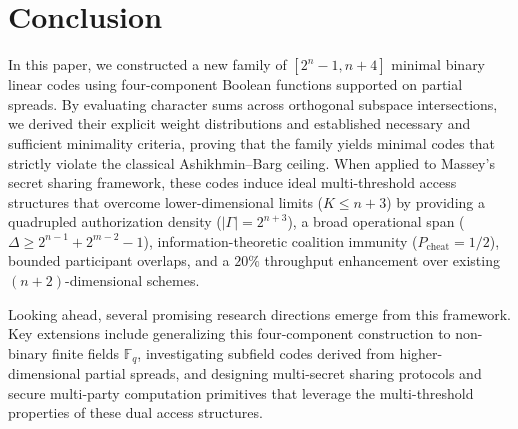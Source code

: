 \documentclass[pdflatex,sn-mathphys-num]{sn-jnl}%
\theoremstyle{thmstyleone}%
\theoremstyle{thmstyletwo}%
\theoremstyle{thmstylethree}%
\begin{document}
\section{Conclusion}
In this paper, we constructed a new family of $[2^n-1, n+4]$ minimal binary linear codes using four-component Boolean functions supported on partial spreads. By evaluating character sums across orthogonal subspace intersections, we derived their explicit weight distributions and established necessary and sufficient minimality criteria, proving that the family yields minimal codes that strictly violate the classical Ashikhmin--Barg ceiling. When applied to Massey's secret sharing framework, these codes induce ideal multi-threshold access structures that overcome lower-dimensional limits ($K \le n+3$) by providing a quadrupled authorization density ($|\Gamma| = 2^{n+3}$), a broad operational span ($\Delta \ge 2^{n-1} + 2^{m-2} - 1$), information-theoretic coalition immunity ($P_{\text{cheat}} = 1/2$), bounded participant overlaps, and a $20\%$ throughput enhancement over existing $(n+2)$-dimensional schemes.

Looking ahead, several promising research directions emerge from this framework. Key extensions include generalizing this four-component construction to non-binary finite fields $\mathbb{F}_q$, investigating subfield codes derived from higher-dimensional partial spreads, and designing multi-secret sharing protocols and secure multi-party computation primitives that leverage the multi-threshold properties of these dual access structures.
\end{document}
